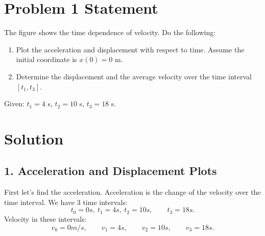 \documentclass{article}
\begin{document}


\section*{Problem 1 Statement}
The figure shows the time dependence of velocity. Do the following:

\begin{enumerate}
    \item Plot the acceleration and displacement with respect to time. Assume the initial coordinate is $x(0) = 0$ m.
    \item Determine the displacement and the average velocity over the time interval $[t_1, t_3]$.
\end{enumerate}

Given: $t_1 = 4$ s, $t_2 = 10$ s, $t_3 = 18$ s.

\section*{Solution}

\subsection*{1. Acceleration and Displacement Plots}
First let's find the acceleration. Acceleration is the change of the velocity over the time interval.
We have 3 time intervals: 
\[
t_0 = 0s, \: t_1 = 4s, \: t_2 = 10s, \qquad t_3 = 18s.
\]
Velocity in these intervals:
\[
v_0 = 0 m/s, \qquad v_1 = 4s, \qquad v_2 = 10s, \qquad v_3 = 18s.
\]
\end{document}
